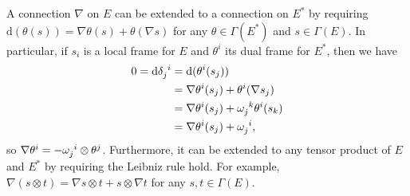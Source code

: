 \documentclass{book}
\renewcommand{\d}{\mathrm{d}}
\theoremstyle{definition}
\numberwithin{equation}{section}
\begin{document}
A connection $\nabla$ on $E$ can be extended to a connection on $E^*$ by requiring $\d(\theta(s)) = \nabla\theta(s) + \theta(\nabla s)$ for any $\theta \in \Gamma(E^*)$ and $s \in \Gamma(E)$. In particular, if $s_i$ is a local frame for $E$ and $\theta^i$ its dual frame for $E^*$, then we have 
\begin{equation} \begin{aligned}
    0 = \d\tensor{\delta}{_j^i} &= \d(\theta^i(s_j)) \\
    &= \nabla\theta^i(s_j) + \theta^i(\nabla s_j) \\
    &= \nabla\theta^i(s_j) + \tensor{\omega}{_j^k} \theta^i(s_k) \\
    &= \nabla\theta^i(s_j) + \tensor{\omega}{_j^i},
\end{aligned} \end{equation}
so $\nabla\theta^i = - \tensor{\omega}{_j^i} \otimes \theta^j$.
Furthermore, it can be extended to any tensor product of $E$ and $E^*$ by requiring the Leibniz rule hold. For example, $\nabla(s \otimes t) = \nabla s \otimes t + s \otimes \nabla t$ for any $s,t \in \Gamma(E)$.
\end{document}
